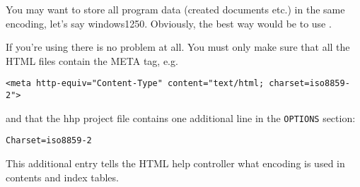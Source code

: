 You may want to store all program data (created documents etc.) in
the same encoding, let's say windows1250. Obviously, the best way would
be to use .


If you're using  there is
no problem at all. You must only make sure that all the HTML files contain
the META tag, e.g.

\begin{verbatim}
<meta http-equiv="Content-Type" content="text/html; charset=iso8859-2">
\end{verbatim}

and that the hhp project file contains one additional line in the {\tt OPTIONS}
section:

\begin{verbatim}
Charset=iso8859-2
\end{verbatim}

This additional entry tells the HTML help controller what encoding is used
in contents and index tables.


